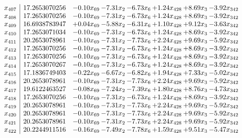 \documentclass[8pt]{article}
\begin{document}
\[\begin{array}{c| c c@{\hskip 2pt} c@{\hskip 2pt} c@{\hskip 2pt} c@{\hskip 2pt} c@{\hskip 2pt} c@{\hskip 2pt} }
 x_{407}   &  17.2653070256 & -0.10 x_{69} & -7.31 x_{2} & -6.73 x_{6} & +  1.24 x_{428} & +  8.69 x_{3} & -3.92 x_{342}\\
 x_{408}   &  17.2653070256 & -0.10 x_{69} & -7.31 x_{2} & -6.73 x_{6} & +  1.24 x_{428} & +  8.69 x_{3} & -3.92 x_{342}\\
 x_{409}   &  16.6938783947 & +  0.04 x_{69} & -5.88 x_{2} & -6.31 x_{6} & +  1.10 x_{428} & +  9.12 x_{3} & -3.63 x_{342}\\
 x_{410}   &  17.2653071034 & -0.10 x_{69} & -7.31 x_{2} & -6.73 x_{6} & +  1.24 x_{428} & +  8.69 x_{3} & -3.92 x_{342}\\
 x_{411}   &  20.2653078961 & -0.10 x_{69} & -7.31 x_{2} & -7.73 x_{6} & +  2.24 x_{428} & +  9.69 x_{3} & -5.92 x_{342}\\
 x_{412}   &  17.2653070256 & -0.10 x_{69} & -7.31 x_{2} & -6.73 x_{6} & +  1.24 x_{428} & +  8.69 x_{3} & -3.92 x_{342}\\
 x_{413}   &  17.2653070256 & -0.10 x_{69} & -7.31 x_{2} & -6.73 x_{6} & +  1.24 x_{428} & +  8.69 x_{3} & -3.92 x_{342}\\
 x_{414}   &  17.2653070267 & -0.10 x_{69} & -7.31 x_{2} & -6.73 x_{6} & +  1.24 x_{428} & +  8.69 x_{3} & -3.92 x_{342}\\
 x_{415}   &  17.1836749403 & -0.22 x_{69} & -6.67 x_{2} & -6.82 x_{6} & +  1.94 x_{428} & +  7.33 x_{3} & -5.02 x_{342}\\
 x_{416}   &  20.2653078961 & -0.10 x_{69} & -7.31 x_{2} & -7.73 x_{6} & +  2.24 x_{428} & +  9.69 x_{3} & -5.92 x_{342}\\
 x_{417}   &  19.6122463527 & -0.08 x_{69} & -7.24 x_{2} & -7.39 x_{6} & +  1.80 x_{428} & +  8.76 x_{3} & -4.73 x_{342}\\
 x_{418}   &  17.2653070256 & -0.10 x_{69} & -7.31 x_{2} & -6.73 x_{6} & +  1.24 x_{428} & +  8.69 x_{3} & -3.92 x_{342}\\
 x_{419}   &  20.2653078961 & -0.10 x_{69} & -7.31 x_{2} & -7.73 x_{6} & +  2.24 x_{428} & +  9.69 x_{3} & -5.92 x_{342}\\
 x_{420}   &  20.2653078961 & -0.10 x_{69} & -7.31 x_{2} & -7.73 x_{6} & +  2.24 x_{428} & +  9.69 x_{3} & -5.92 x_{342}\\
 x_{421}   &  20.2653078961 & -0.10 x_{69} & -7.31 x_{2} & -7.73 x_{6} & +  2.24 x_{428} & +  9.69 x_{3} & -5.92 x_{342}\\
 x_{422}   &  20.2244911516 & -0.16 x_{69} & -7.49 x_{2} & -7.78 x_{6} & +  1.59 x_{428} & +  9.51 x_{3} & -5.47 x_{342}\\

\end{array}\]
\end{document}

